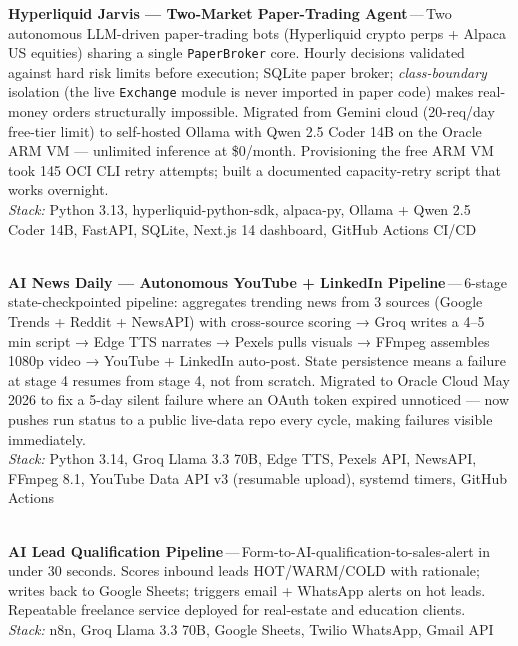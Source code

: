 \documentclass[a4paper,11pt]{article}
\newcommand{\project}[3]{%
  \textbf{#1}\,{\color{muted}---}\,#2\\[1pt]%
  {\small\color{muted}\textit{Stack:} #3}\vspace{8pt}%
}
\begin{document}
\project{Hyperliquid Jarvis --- Two-Market Paper-Trading Agent}{Two autonomous LLM-driven paper-trading bots (Hyperliquid crypto perps + Alpaca US equities) sharing a single \texttt{PaperBroker} core. Hourly decisions validated against hard risk limits before execution; SQLite paper broker; \textit{class-boundary} isolation (the live \texttt{Exchange} module is never imported in paper code) makes real-money orders structurally impossible. Migrated from Gemini cloud (20-req/day free-tier limit) to self-hosted Ollama with Qwen 2.5 Coder 14B on the Oracle ARM VM --- unlimited inference at \$0/month. Provisioning the free ARM VM took 145 OCI CLI retry attempts; built a documented capacity-retry script that works overnight.}{Python 3.13, hyperliquid-python-sdk, alpaca-py, Ollama + Qwen 2.5 Coder 14B, FastAPI, SQLite, Next.js 14 dashboard, GitHub Actions CI/CD}
\vspace{8pt}\\

\project{AI News Daily --- Autonomous YouTube + LinkedIn Pipeline}{6-stage state-checkpointed pipeline: aggregates trending news from 3 sources (Google Trends + Reddit + NewsAPI) with cross-source scoring → Groq writes a 4--5 min script → Edge TTS narrates → Pexels pulls visuals → FFmpeg assembles 1080p video → YouTube + LinkedIn auto-post. State persistence means a failure at stage 4 resumes from stage 4, not from scratch. Migrated to Oracle Cloud May 2026 to fix a 5-day silent failure where an OAuth token expired unnoticed --- now pushes run status to a public live-data repo every cycle, making failures visible immediately.}{Python 3.14, Groq Llama 3.3 70B, Edge TTS, Pexels API, NewsAPI, FFmpeg 8.1, YouTube Data API v3 (resumable upload), systemd timers, GitHub Actions}
\vspace{8pt}\\

\project{AI Lead Qualification Pipeline}{Form-to-AI-qualification-to-sales-alert in under 30 seconds. Scores inbound leads HOT/WARM/COLD with rationale; writes back to Google Sheets; triggers email + WhatsApp alerts on hot leads. Repeatable freelance service deployed for real-estate and education clients.}{n8n, Groq Llama 3.3 70B, Google Sheets, Twilio WhatsApp, Gmail API}
\vspace{8pt}\\
\end{document}
